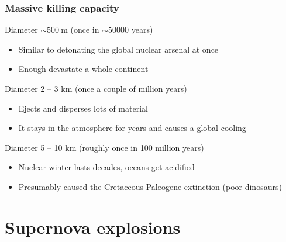 \documentclass[aspectratio=169]{beamer}
\begin{document}
\begin{frame}
\frametitle{Massive killing capacity}

\begin{block}{Diameter $\sim 500 \: \mathrm{m}$ (once in $\sim 50000$ years)}
\begin{itemize}
\item Similar to detonating the global nuclear arsenal at once
\item Enough devastate a whole continent
\end{itemize}
\end{block}

\begin{block}{Diameter 2 -- 3 km (once a couple of million years)}
\begin{itemize}
\item Ejects and disperses lots of material
\item It stays in the atmosphere for years and causes a global cooling
\end{itemize}
\end{block}

\begin{block}{Diameter 5 -- 10 km (roughly once in 100 million years)}
\begin{itemize}
\item Nuclear winter lasts decades, oceans get acidified
\item Presumably caused the Cretaceous-Paleogene extinction (poor dinosaurs)
\end{itemize}
\end{block}
\end{frame}

\section{Supernova explosions}
\end{document}

